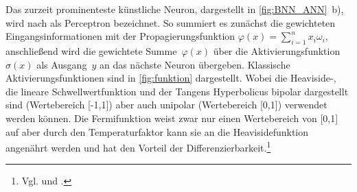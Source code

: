 Das zurzeit prominenteste künstliche Neuron, dargestellt in \hbox{\autoref{fig:BNN_ANN} b)}, wird nach \citet{perceptron_ros58} als Perceptron bezeichnet. %
So summiert es zunächst die gewichteten Eingangsinformationen mit der Propagierungsfunktion $\varphi (x)=\sum_{i=1}^{n}x_{i}\omega_{i}$, anschließend wird die gewichtete Summe~$\varphi(x)$ über die Aktivierungsfunktion~$\sigma(x)$ als Ausgang~$y$ an das nächste Neuron übergeben.
%
%
%
Klassische Aktivierungsfunktionen sind in \autoref{fig:funktion} dargestellt. Wobei die \hbox{Heaviside-,} die lineare Schwellwertfunktion und der Tangens Hyperbolicus bipolar dargestellt sind (Wertebereich [-1,1]) aber auch unipolar (Wertebereich [0,1]) verwendet werden können. Die Fermifunktion weist zwar nur einen Wertebereich von [0,1] auf aber durch den Temperaturfaktor kann sie an die Heavisidefunktion angenährt werden und hat den Vorteil der Differenzierbarkeit.\footnote{Vgl. \citet[5]{neuralnet_intro} und \citet[39 f]{dkriesel07}.}

